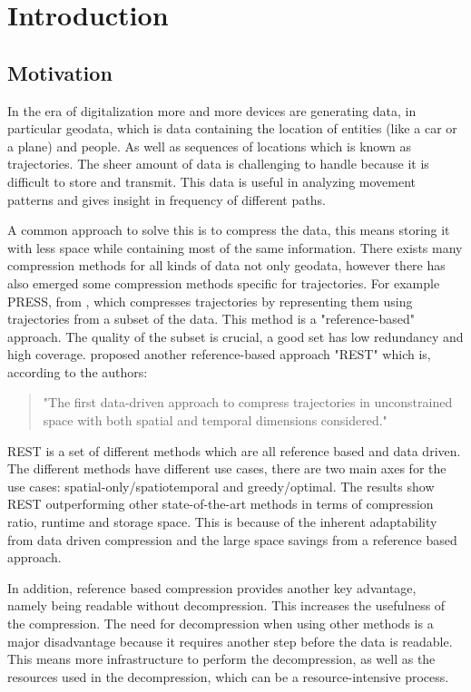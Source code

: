 \chapter{Introduction}
\section{Motivation}

In the era of digitalization more and more devices are generating data, in particular geodata, which is data containing the location of entities (like a car or a plane) and people. As well as sequences of locations which is known as trajectories. The sheer amount of data is challenging to handle because it is difficult to store and transmit. This data is useful in analyzing movement patterns and gives insight in frequency of different paths.

A common approach to solve this is to compress the data, this means storing it with less space while containing most of the same information. There exists many compression methods for all kinds of data not only geodata, however there has also emerged some compression methods specific for trajectories. For example PRESS, from \textcite{song2014press}, which compresses trajectories by representing them using trajectories from a subset of the data. This method is a "reference-based" approach. The quality of the subset is crucial, a good set has low redundancy and high coverage. \textcite{zhao2018rest} proposed another reference-based approach "REST" which is, according to the authors:
\begin{quote}
    "The first data-driven approach to compress trajectories in unconstrained space with both spatial and temporal dimensions considered."
\end{quote}
REST is a set of different methods which are all reference based and data driven. The different methods have different use cases, there are two main axes for the use cases: spatial-only/spatiotemporal and greedy/optimal. The results show REST outperforming other state-of-the-art methods in terms of compression ratio, runtime and storage space. This is because of the inherent adaptability from data driven compression and the large space savings from a reference based approach.

In addition, reference based compression provides another key advantage, \\ namely being readable without decompression. This increases the usefulness of the compression. The need for decompression when using other methods is a major disadvantage because it requires another step before the data is readable. This means more infrastructure to perform the decompression, as well as the resources used in the decompression, which can be a resource-intensive process.

